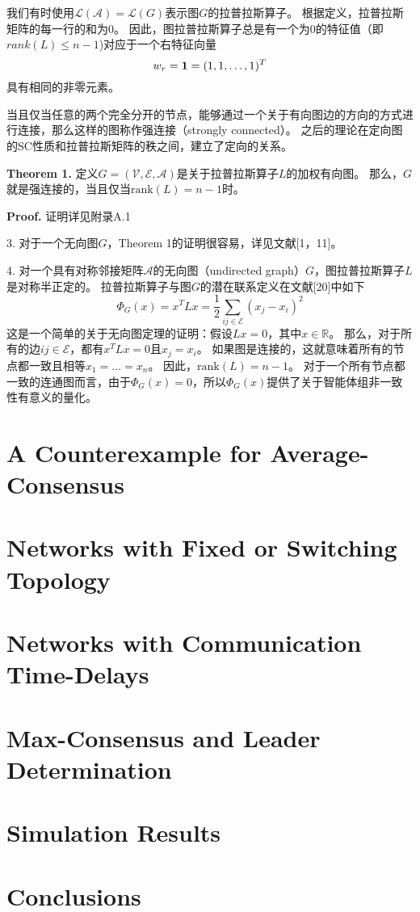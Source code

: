 \documentclass{article}
\begin{document}
我们有时使用$\mathcal{L}(\mathcal{A}) = \mathcal{L}(G)$表示图$G$的拉普拉斯算子。
根据定义，拉普拉斯矩阵的每一行的和为0。
因此，图拉普拉斯算子总是有一个为0的特征值（即$rank(L)\le n-1$)对应于一个右特征向量
\begin{equation}
    w_r = \mathbf{1} = (1,1,\dots,1)^T \notag
\end{equation}
具有相同的非零元素。

当且仅当任意的两个完全分开的节点，能够通过一个关于有向图边的方向的方式进行连接，那么这样的图称作强连接（strongly connected）。
之后的理论在定向图的SC性质和拉普拉斯矩阵的秩之间，建立了定向的关系。

\noindent \textbf{Theorem 1.} 定义$G=(\mathcal{V},\mathcal{E},\mathcal{A})$是关于拉普拉斯算子$L$的加权有向图。
那么，$G$就是强连接的，当且仅当$\text{rank}(L)=n-1$时。

\noindent \textbf{Proof.} 证明详见附录A.1

 3. 对于一个无向图$G$，Theorem 1的证明很容易，详见文献[1，11]。

 4. 对一个具有对称邻接矩阵$\mathcal{A}$的无向图（undirected graph）$G$，图拉普拉斯算子$L$是对称半正定的。
拉普拉斯算子与图$G$的潜在联系定义在文献[20]中如下
\begin{equation}
    \Phi_G(x) = x^T Lx = \frac{1}{2} \sum_{ij\in \mathcal{E}}(x_j - x_i)^2
\end{equation}
这是一个简单的关于无向图定理的证明：假设$Lx=0$，其中$x\in \mathbb{R}$。
那么，对于所有的边$ij\in \mathcal{E}$，都有$x^TLx=0$且$x_j=x_i$。
如果图是连接的，这就意味着所有的节点都一致且相等$x_1=\dots=x_n$。
因此，$\text{rank}(L)=n-1$。
对于一个所有节点都一致的连通图而言，由于$\Phi_G(x)=0$，所以$\Phi_G(x)$提供了关于智能体组非一致性有意义的量化。




\section{A Counterexample for Average-Consensus}



\section{Networks with Fixed or Switching Topology}



\section{Networks with Communication Time-Delays}



\section{Max-Consensus and Leader Determination}



\section{Simulation Results}



\section{Conclusions}
\end{document}
